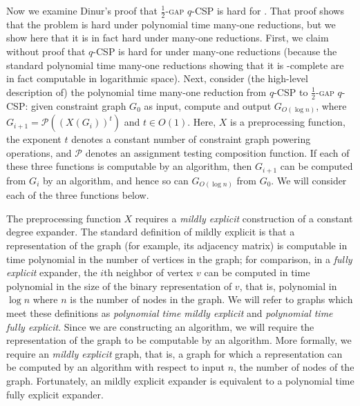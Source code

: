 \documentclass{article}
\begin{document}
Now we examine Dinur's proof that \textsc{$\frac{1}{2}$-gap $q$-CSP} is hard for \NP{} \cite{dinur07}.
That proof shows that the problem is hard under polynomial time many-one reductions, but we show here that it is in fact hard under \NC{} many-one reductions.
First, we claim without proof that \textsc{$q$-CSP} is hard for \NP{} under \NC{} many-one reductions (because the standard polynomial time many-one reductions showing that it is \NP-complete are in fact computable in logarithmic space).
Next, consider (the high-level description of) the polynomial time many-one reduction from \textsc{$q$-CSP} to \textsc{$\frac{1}{2}$-gap $q$-CSP}: given constraint graph $G_0$ as input, compute and output $G_{O(\log n)}$, where $G_{i + 1} = \mathcal{P}(\left(X(G_i)\right)^t)$ and $t \in O(1)$.
Here, $X$ is a preprocessing function, the exponent $t$ denotes a constant number of constraint graph powering operations, and $\mathcal{P}$ denotes an assignment testing composition function.
If each of these three functions is computable by an \NC{} algorithm, then $G_{i + 1}$ can be computed from $G_i$ by an \NC{} algorithm, and hence so can $G_{O(\log n)}$ from $G_0$.
We will consider each of the three functions below.

The preprocessing function $X$ requires a \emph{mildly explicit} construction of a constant degree expander.
The standard definition of mildly explicit is that a representation of the graph (for example, its adjacency matrix) is computable in time polynomial in the number of vertices in the graph; for comparison, in a \emph{fully explicit} expander, the $i$th neighbor of vertex $v$ can be computed in time polynomial in the size of the binary representation of $v$, that is, polynomial in $\log n$ where $n$ is the number of nodes in the graph.
We will refer to graphs which meet these definitions as \emph{polynomial time mildly explicit} and \emph{polynomial time fully explicit}.
Since we are constructing an \NC{} algorithm, we will require the representation of the graph to be computable by an \NC{} algorithm.
More formally, we require an \emph{\NC{} mildly explicit} graph, that is, a graph for which a representation can be computed by an \NC{} algorithm with respect to input $n$, the number of nodes of the graph.
Fortunately, an \NC{} mildly explicit expander is equivalent to a polynomial time fully explicit expander.
\end{document}
